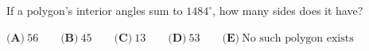 If a polygon's interior angles sum to $1484^\circ$, how many sides does it have?

$\textbf{(A)}~56\qquad\textbf{(B)}~45\qquad\textbf{(C)}~13\qquad\textbf{(D)}~53\qquad\textbf{(E)}~\text{No such polygon exists}\qquad$
